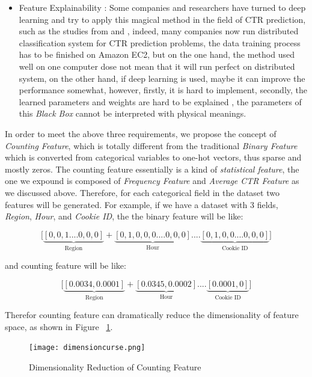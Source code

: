 \begin{itemize}
    \item Feature Explainability : Some companies and researchers have turned to deep learning and try to apply this magical method in the field of CTR prediction, such as the studies from \cite{deeplearning} and \cite{wang2014collaborative}, indeed, many companies now run distributed classification system for CTR prediction problems, the data training process has to be finished on Amazon EC2, but on the one hand, the method used well on one computer dose not mean that it will run perfect on distributed system, on the other hand, if deep learning is used, maybe it can improve the performance somewhat, however, firstly, it is hard to implement, secondly, the learned parameters and weights are hard to be explained , the parameters of this \textit{Black Box} cannot be interpreted with physical meanings.  
    
\end{itemize}

In order to meet the above three requirements, we propose the concept of \textit{Counting Feature}, which is totally different from the traditional \textit{Binary Feature} which is converted from categorical variables to one-hot vectors, thus sparse and mostly zeros. The counting feature essentially is a kind of \textit{statistical feature}, the one we expound is composed of \textit{Frequency Feature} and \textit{Average CTR Feature} as we discussed above. Therefore, for each categorical field in the dataset two features will be generated. For example, if we have a dataset with 3 fields, \textit{Region}, \textit{Hour}, and \textit{Cookie ID}, the the binary feature will be like: 

\begin{equation}
 \Big[\underbrace{[0,0,1....0,0,0]}_\textrm{Region} + \underbrace{[0,1,0,0,0....0,0,0]}_\textrm{Hour}.... \underbrace{[0,1,0,0....0,0,0]}_\textrm{Cookie ID}]
\end{equation}

and counting feature will be like:

\begin{equation}
 \Big[\underbrace{[0.0034,0.0001]}_\textrm{Region} + \underbrace{[0.0345,0.0002]}_\textrm{Hour}.... \underbrace{[0.0001,0]}_\textrm{Cookie ID}]
\end{equation}

Therefor counting feature can dramatically reduce the dimensionality of feature space, as shown in Figure ~\ref{fig:dimensionreduct}.

\begin{figure}[h]
\centering
\texttt{[image: dimensioncurse.png]}
\caption{Dimensionality Reduction of Counting Feature}
\label{fig:dimensionreduct}
\end{figure}

